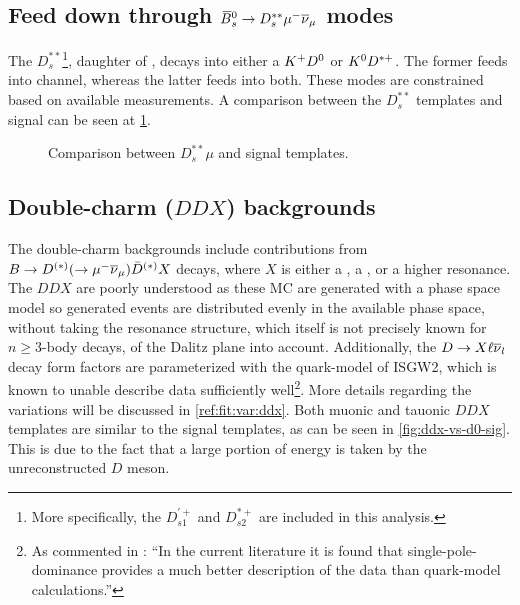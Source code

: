 \subsection{Feed down through ${{\kern 0.18em\overline{\kern -0.18em B}}{}^0_{s}} \rightarrow D_s^{**}{\mu^-}{{\overline{\nu}}_\mu}$ modes}

The $D_s^{**}$\footnote{
    More specifically, the $D_{s1}^{'+}$ and $D_{s2}^{*+}$ are included in
    this analysis.
}, daughter of \Bsb, decays into either a ${{K}^+}{{D}^0}$ or ${{K}^0}{{D}^{*+}}$.
The former feeds into \Dz channel, whereas the latter feeds into both.
These modes are constrained based on available measurements.
A comparison between the $D_s^{**}$ templates and \Dz\taum signal can be
seen at \cref{fig:d_s-vs-d0-sig}.

\begin{figure}[!htb]

    \caption{Comparison between $D_s^{**}\mu$ and \Dz\taum signal templates.}
    \label{fig:d_s-vs-d0-sig}
\end{figure}


\subsection{Double-charm ($DDX$) backgrounds}
\label{ref:fit:tmpl:ddx}

The double-charm backgrounds include contributions from
$B \rightarrow D^{(*)}(\rightarrow {\ensuremath{\mu^-}}{\ensuremath{{\overline{\nu}}_\mu}})\bar{D}^{(*)} X$ decays, where $X$
is either a \kaon, a \Kstar, or a higher \Kstar resonance.
The $DDX$ are poorly understood as these MC are generated with
a phase space model so generated events are distributed evenly in the available
phase space, without taking the resonance structure,
which itself is not precisely known for $n \geq 3$-body decays,
of the Dalitz plane into account.
Additionally, the $D \rightarrow X \ell{\ensuremath{{\overline{\nu}}_l}}$ decay form factors are
parameterized with the quark-model of ISGW2,
which is known to unable describe data sufficiently well\footnote{
    As commented in \cite{LHCb-ANA-2020-056}:
    ``In the current literature it is found that single-pole-dominance provides
    a much better description of the data than quark-model calculations.''
}.
More details regarding the variations will be discussed in
\cref{ref:fit:var:ddx}.
Both muonic and tauonic $DDX$ templates are similar to the signal templates,
as can be seen in \cref{fig:ddx-vs-d0-sig}.
This is due to the fact that a large portion of energy is taken by the
unreconstructed $D$ meson.

